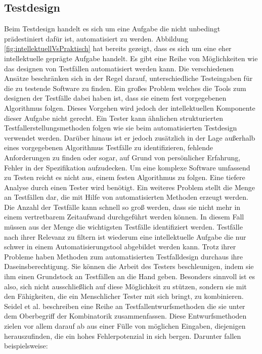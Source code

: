 \subsection{Testdesign}
\label{subsec:testdesign}
Beim Testdesign handelt es sich um eine Aufgabe die nicht unbedingt prädestiniert dafür ist, automatisiert zu werden. Abbildung \ref{fig:intellektuellVsPraktisch} hat bereits gezeigt, dass es sich um eine eher intellektuelle geprägte Aufgabe handelt.
Es gibt eine Reihe von Möglichkeiten wie das designen von Testfällen automatisiert werden kann. Die verschiedenen Ansätze beschränken sich in der Regel darauf, unterschiedliche Testeingaben für die zu testende Software zu finden.
Ein großes Problem welches die Tools zum designen der Testfälle dabei haben ist, dass sie einem fest vorgegebenen Algorithmus folgen. Dieses Vorgehen wird jedoch der intellektuellen Komponente dieser Aufgabe nicht gerecht. Ein Tester kann ähnlichen strukturierten Testfallerstellungsmethoden folgen wie sie beim automatisierten Testdesign verwendet werden. Darüber hinaus ist er jedoch zusätzlich in der Lage außerhalb eines vorgegebenen Algorithmus Testfälle zu identifizieren, fehlende Anforderungen zu finden oder sogar, auf Grund von persönlicher Erfahrung, Fehler in der Spezifikation aufzudecken. Um eine komplexe Software umfassend zu Testen reicht es nicht aus, einem festen Algorithmus zu folgen. Eine tiefere Analyse durch einen Tester wird benötigt. 
Ein weiteres Problem stellt die Menge an Testfällen dar, die mit Hilfe von automatisierten Methoden erzeugt werden. Die Anzahl der Testfälle kann schnell so groß werden, dass sie nicht mehr in einem vertretbarem Zeitaufwand durchgeführt werden können. In diesem Fall müssen aus der Menge die wichtigsten Testfälle identifiziert werden. Testfälle nach ihrer Relevanz zu filtern ist wiederum eine intellektuelle Aufgabe die nur schwer in einem Automatisierungstool abgebildet werden kann.
Trotz ihrer Probleme haben Methoden zum automatisierten Testfalldesign durchaus ihre Daseinsberechtigung. Sie können die Arbeit des Testers beschleunigen, indem sie ihm einen Grundstock an Testfällen an die Hand geben. Besonders sinnvoll ist es also, sich nicht ausschließlich auf diese Möglichkeit zu stützen, sondern sie mit den Fähigkeiten, die ein Menschlicher Tester mit sich bringt, zu kombinieren. \cite[vgl. S. 18 ff.]{fewster_software_1999}
Seidel et al. \cite[vgl. S. 27]{seidl_basiswissen_2012} beschreiben eine Reihe an Testfallentwurfsmethoden die sie unter dem Oberbegriff der Kombinatorik zusammenfassen. Diese Entwurfsmethoden zielen vor allem darauf ab aus einer Fülle von möglichen Eingaben, diejenigen herauszufinden, die ein hohes Fehlerpotenzial in sich bergen. Darunter fallen beispielsweise:
